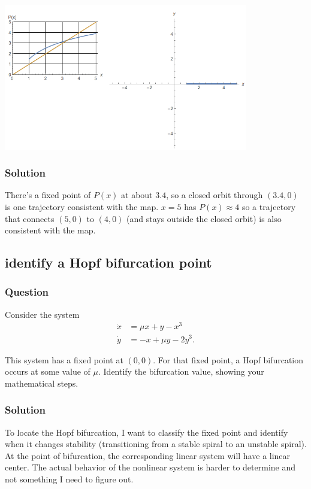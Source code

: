 \documentclass[12pt,letterpaper,noanswers]{exam}
\begin{document}
\includegraphics[width=0.8\textwidth]{img/examp2Lorenz.png} 

\subsubsection{Solution}
There's a fixed point of $P(x)$ at about $3.4$, so a closed orbit through $(3.4,0)$ is one trajectory consistent with the map.  $x = 5$ has $P(x) \approx 4$ so a trajectory that connects $(5,0)$ to $(4,0)$ (and stays outside the closed orbit) is also consistent with the map.


\subsection{identify a Hopf bifurcation point}
\subsubsection{Question}
Consider the system 
\begin{align*}
\dot x &= \mu x + y - x^3 \\
\dot y &= -x+\mu y - 2y^3.
\end{align*}

This system has a fixed point at $(0, 0)$.  For that fixed point, a Hopf bifurcation occurs at some value of $\mu$.  Identify the bifurcation value, showing your mathematical steps.


\subsubsection{Solution}
To locate the Hopf bifurcation, I want to classify the fixed point and identify when it changes stability (transitioning from a stable spiral to an unstable spiral).  At the point of bifurcation, the corresponding linear system will have a linear center.  The actual behavior of the nonlinear system is harder to determine and not something I need to figure out.
\end{document}
